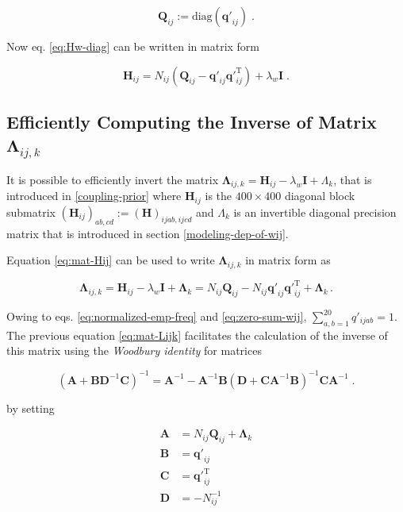 \documentclass[12pt,a4paper,twoside]{book}
\renewcommand{\H}{\mathbf{H}}
\newcommand{\I}{\mathbf{I}}
\newcommand{\Lijk}{\mathbf{\Lambda}_{ij,k}}
\newcommand{\Lk}{\mathbf{\Lambda}_k}
\newcommand{\Qij}{\mathbf{Q}_{ij}}
\newcommand{\qij}{\mathbf{q\prime}_{ij}}
\theoremstyle{definition}
\theoremstyle{definition}
\theoremstyle{remark}
\begin{document}
\begin{equation}
    \Qij := \text{diag}(\qij) \; .
\end{equation}

Now eq. \eqref{eq:Hw-diag} can be written in matrix form

\begin{equation}
     \H_{ij} = N_{ij} \left( \Qij -  \qij \qij^{\mathrm{T}} \right)  + \lambda_w \I \; .
\label{eq:mat-Hij}
\end{equation}

\subsection{\texorpdfstring{Efficiently Computing the Inverse of Matrix
\(\Lijk\)}{Efficiently Computing the Inverse of Matrix \textbackslash{}Lijk}}\label{inv-lambda-ij-k}

It is possible to efficiently invert the matrix
\(\Lijk = \H_{ij} - \lambda_w \I + \Lambda_k\), that is introduced in
\ref{coupling-prior} where \(\H_{ij}\) is the \(400 \times 400\)
diagonal block submatrix \((\H_{ij})_{ab,cd} := (\H)_{ijab,ijcd}\) and
\(\Lambda_k\) is an invertible diagonal precision matrix that is
introduced in section \ref{modeling-dep-of-wij}.

Equation \eqref{eq:mat-Hij} can be used to write \(\Lijk\) in matrix form
as

\begin{equation}
     \Lijk = \H_{ij} - \lambda_w \I + \Lk = N_{ij} \Qij- N_{ij} \qij \qij^{\mathrm{T}} + \Lk \,.
\label{eq:mat-Lijk}
\end{equation}

Owing to eqs. \eqref{eq:normalized-emp-freq} and \eqref{eq:zero-sum-wij},
\(\sum_{a,b=1}^{20} q'_{ijab} = 1\). The previous equation
\eqref{eq:mat-Lijk} facilitates the calculation of the inverse of this
matrix using the \emph{Woodbury identity} for matrices

\begin{equation}
    (\mathbf{A} + \mathbf{B} \mathbf{D}^{-1} \mathbf{C})^{-1} = \mathbf{A}^{-1} - \mathbf{A}^{-1} \mathbf{B} (\mathbf{D} + \mathbf{C} \mathbf{A}^{-1} \mathbf{B}) ^{-1} \mathbf{C} \mathbf{A}^{-1} \;. 
\end{equation}

by setting

\begin{align}
  \mathbf{A} &= N_{ij} \Qij + \Lk \\
  \mathbf{B} &= \qij \\
  \mathbf{C} &= \qij^\mathrm{T} \\
  \mathbf{D} &=- N_{ij}^{-1} \\
\end{align}
\end{document}
